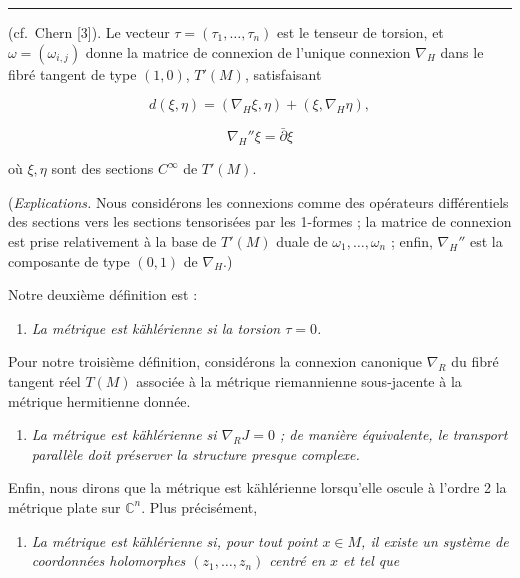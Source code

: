 \documentclass[
  french,
  a3paper,
  a3paper]{extarticle}
\providecommand{\tightlist}{%
  \setlength{\itemsep}{0pt}\setlength{\parskip}{0pt}}
\begin{document}
\vspace{0.7mm}\hrule\vspace{1.6mm}

\fontsize{9}{11}\selectfont

(cf.~Chern {[}3{]}). Le vecteur \(\tau=(\tau_1,\ldots,\tau_n)\) est le
tenseur de torsion, et \(\omega=(\omega_{i,j})\) donne la matrice de
connexion de l'unique connexion \(\nabla_H\) dans le fibré tangent de
type \((1,0)\), \(T'(M)\), satisfaisant

\[d(\xi,\eta)=(\nabla_H\xi,\eta)+(\xi,\nabla_H\eta),\]

\[\nabla_H''\xi=\bar\partial\xi\]

où \(\xi,\eta\) sont des sections \(C^\infty\) de \(T'(M)\).

(\emph{Explications.} Nous considérons les connexions comme des
opérateurs différentiels des sections vers les sections tensorisées par
les 1-formes ; la matrice de connexion est prise relativement à la base
de \(T'(M)\) duale de \(\omega_1,\ldots,\omega_n\) ; enfin,
\(\nabla_H''\) est la composante de type \((0,1)\) de \(\nabla_H\).)

Notre deuxième définition est :

\begin{enumerate}
\def\labelenumi{(\roman{enumi})}
\setcounter{enumi}{1}
\tightlist
\item
  \emph{La métrique est kählérienne si la torsion \(\tau=0\).}
\end{enumerate}

Pour notre troisième définition, considérons la connexion canonique
\(\nabla_R\) du fibré tangent réel \(T(M)\) associée à la métrique
riemannienne sous-jacente à la métrique hermitienne donnée.

\begin{enumerate}
\def\labelenumi{(\roman{enumi})}
\setcounter{enumi}{2}
\tightlist
\item
  \emph{La métrique est kählérienne si \(\nabla_RJ=0\) ; de manière
  équivalente, le transport parallèle doit préserver la structure
  presque complexe.}
\end{enumerate}

Enfin, nous dirons que la métrique est kählérienne lorsqu'elle oscule à
l'ordre 2 la métrique plate sur \(\mathbb C^n\). Plus précisément,

\begin{enumerate}
\def\labelenumi{(\roman{enumi})}
\setcounter{enumi}{3}
\tightlist
\item
  \emph{La métrique est kählérienne si, pour tout point \(x\in M\), il
  existe un système de coordonnées holomorphes \((z_1,\ldots,z_n)\)
  centré en \(x\) et tel que}
\end{enumerate}
\end{document}
